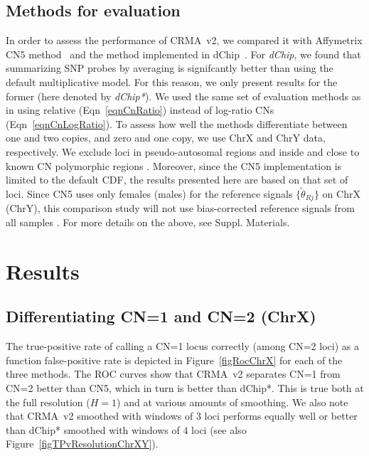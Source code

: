\documentclass{bioinfo}
\newcommand{\TPrate}{true-positive rate\xspace}
\newcommand{\FPrate}{false-positive rate\xspace}
\begin{document}
\subsection{Methods for evaluation}
\label{secEvaluation}
In order to assess the performance of CRMA~v2, we compared it with Affymetrix CN5 method~\citep{Affymetrix_2008m} and the method implemented in dChip~\citep{LiWong_2001}.  For \emph{dChip}, we found that summarizing SNP probes by averaging is signifcantly better than using the default multiplicative model.  For this reason, we only present results for the former (here denoted by \emph{dChip*}).  
We used the same set of evaluation methods as in \citet{BengtssonH_etal_2008a} using relative (Eqn~\eqref{eqnCnRatio}) instead of log-ratio CNs (Eqn~\eqref{eqnCnLogRatio}).
To assess how well the methods differentiate between one and two copies, and zero and one copy, we use ChrX and ChrY data, respectively.  We exclude loci in pseudo-autosomal regions and inside and close to known CN polymorphic regions \citep{RedonR_etal_2006}.  Moreover, since the CN5 implementation is limited to the default CDF, the results presented here are based on that set of loci.  
Since CN5 uses only females (males) for the reference signals $\{\tilde\theta_{Rj}\}$ on ChrX (ChrY), this comparison study will not use bias-corrected reference signals from all samples \citep{BengtssonH_etal_2008a}.
For more details on the above, see Suppl. Materials.


 
\section{Results}
\label{secResults}

\subsection{Differentiating CN=1 and CN=2 (ChrX)}
The \TPrate of calling a CN=1 locus correctly (among CN=2 loci) as a function \FPrate is depicted in Figure~\ref{figRocChrX} for each of the three methods.
The ROC curves show that CRMA~v2 separates CN=1 from CN=2 better than CN5, which in turn is better than dChip*.  This is true both at the full resolution ($H=1$) and at various amounts of smoothing.  
We also note that CRMA~v2 smoothed with windows of $3$ loci performs equally well or better than dChip* smoothed with windows of $4$ loci (see also Figure~\ref{figTPvResolutionChrXY}).
\end{document}
